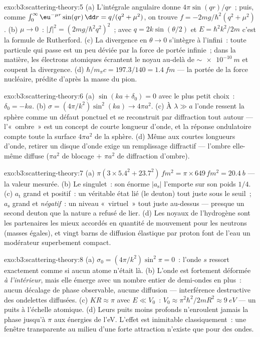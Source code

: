 \begin{solution}{exo:b3:scattering-theory:5}
(a) L'intégrale angulaire donne $4\pi\sin(qr)/qr$~; puis, comme
$\int_0^\infty\eu^{-\mu r}\sin(qr)\,\dd r = q/(q^2 + \mu^2)$,
on trouve $f = -2mg/\hbar^2(q^2 + \mu^2)$. (b) $\mu \to 0$~: $|f|^2 =
(2mg/\hbar^2q^2)^2$~; avec $q = 2k\sin(\theta/2)$ et $E =
\hbar^2k^2/2m$ c'est la formule de Rutherford. (c) La divergence en $\theta \to
0$ s'intègre à l'infini~: toute particule qui passe est un peu déviée
par la force de portée infinie~; dans la matière, les électrons
atomiques écrantent le noyau au-delà de $\sim\qty{e-10}{m}$ et
coupent la divergence. (d) $\hbar/m_\pi c = 197.3/140 = \qty{1.4}{fm}$
--- la portée de la force nucléaire, prédite d'après la masse du pion.
\end{solution}

\begin{solution}{exo:b3:scattering-theory:6}
(a) $\sin(ka + \delta_0) = 0$ avec le plus petit choix~: $\delta_0
= -ka$. (b) $\sigma = (4\pi/k^2)\sin^2(ka) \to 4\pi a^2$. (c) À
$\lambda \gg a$ l'onde ressent la sphère comme un défaut ponctuel et
se reconstruit par diffraction tout autour --- l'«~ombre~» est un
concept de courte longueur d'onde, et la réponse ondulatoire compte
toute la surface $4\pi a^2$ de la sphère. (d) Même aux courtes
longueurs d'onde, retirer un disque d'onde exige un remplissage
diffractif --- l'ombre elle-même diffuse ($\pi a^2$ de blocage $+$
$\pi a^2$ de diffraction d'ombre).
\end{solution}

\begin{solution}{exo:b3:scattering-theory:7}
(a) $\pi(3 \times 5.4^2 + 23.7^2)\,\unit{fm^2} = \pi \times 649
\,\unit{fm^2} = \qty{20.4}{b}$ --- la valeur mesurée. (b) Le
singulet~: son énorme $|a_{\text{s}}|$ l'emporte sur son poids $1/4$.
(c) $a_{\text{t}}$ grand et positif~: un véritable état lié (le
deuton) tout juste sous le seuil~; $a_{\text{s}}$ grand et
\emph{négatif}~: un niveau «~virtuel~» tout juste au-dessus ---
presque un second deuton que la nature a refusé de lier. (d) Les
noyaux de l'hydrogène sont les partenaires les mieux accordés en
quantité de mouvement pour les neutrons (masses égales), et vingt
barns de diffusion élastique par proton font de l'eau un modérateur
superbement compact.
\end{solution}

\begin{solution}{exo:b3:scattering-theory:8}
(a) $\sigma_0 = (4\pi/k^2)\sin^2\pi = 0$~: l'onde $s$ ressort
exactement comme si aucun atome n'était là. (b) L'onde est fortement
déformée \emph{à l'intérieur}, mais elle émerge avec un nombre entier
de demi-ondes en plus~: aucun décalage de phase observable, aucune
diffusion --- interférence destructive des ondelettes diffusées. (c) $KR
\approx \pi$ avec $E \ll V_0$~: $V_0 \approx \pi^2\hbar^2/2mR^2
\approx \qty{9}{eV}$ --- un puits à l'échelle atomique. (d) Leurs
puits moins profonds n'enroulent jamais la phase jusqu'à $\pi$ aux
énergies de l'eV. L'effet est inimitable classiquement~: une fenêtre
transparente au milieu d'une forte attraction n'existe que pour des
ondes.
\end{solution}

